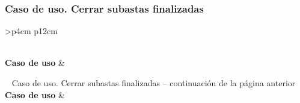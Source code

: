 \subsubsection{Caso de uso. Cerrar subastas finalizadas} \label{sec:cu_cerrar-subastas}
\begin{longtable}{
    >{}p{4cm}
    p{12cm}
    }
    \caption{Caso de uso. Cerrar subastas finalizadas} \label{table:cu_cerrar-subastas} \\
    \toprule
    \textbf{Caso de uso} &  \\
    \endfirsthead
    
    {{ \tablename\ \thetable{} Caso de uso. Cerrar subastas finalizadas -- continuación de la página anterior}} \\
    \toprule
    \textbf{Caso de uso} &  \\
    \midrule
    \endhead
    
    \midrule
     \\ 
    \endfoot
    
    \bottomrule
    \endlastfoot
    

\end{longtable}
